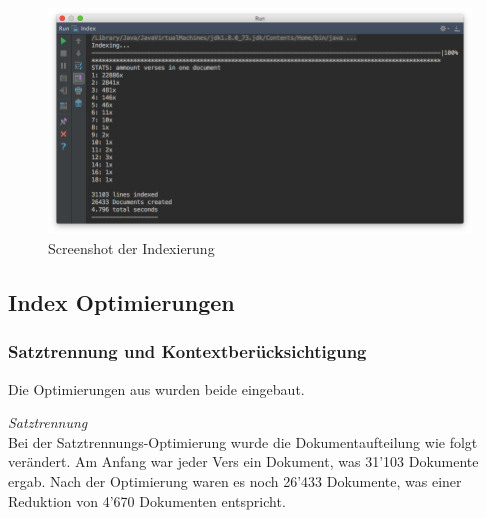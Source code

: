 \vfill
\begin{figure}[H]
	\centering
	\includegraphics[width=1.0\textwidth]{images/3-realization/indexing_screenshot.png}
	\caption{Screenshot der Indexierung}
\end{figure}


\newpage
\subsection{Index Optimierungen}

\subsubsection{Satztrennung und Kontextberücksichtigung}
Die Optimierungen aus  wurden beide eingebaut.

\vspace{0.5em}
\textit{Satztrennung}
\vspace{0.5em}\\
Bei der Satztrennungs-Optimierung wurde die Dokumentaufteilung wie folgt verändert.
Am Anfang war jeder Vers ein Dokument, was 31'103 Dokumente ergab.
Nach der Optimierung waren es noch 26'433 Dokumente, was einer Reduktion von 4'670 Dokumenten entspricht.

